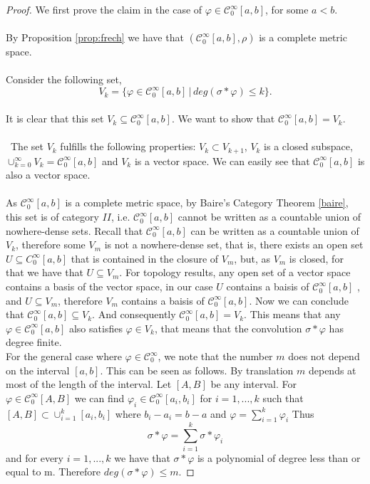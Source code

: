\documentclass[../main.tex]{subfiles}
\begin{document}
	\begin{proof}
		We first prove the claim in the case of $\varphi \in \mathcal{C}^\infty_0[a,b]$, for some $a<b$. \\ \\ By Proposition \ref{prop:frech} we have that $(\mathcal{C}^\infty_0[a,b],\rho)$ is a complete metric space.  \\ \\  Consider the following set, \\ $$V_k= \{\varphi \in \mathcal{C}_0^\infty[a,b] \, | \,  deg(\sigma \ast \varphi ) \leq k\}.$$ \\
		It is clear that this set $V_k\subseteq \mathcal{C}_0^\infty[a,b]. $ 
		We want to show that $\mathcal{C}_0^\infty[a,b] = V_k.$ \\ \\  The set $ V_k$ fulfills the following properties: $V_k \subset V_{k+1}$, $V_k $ is a closed subspace, $\cup_{k=0}^\infty V_k = \mathcal{C}_0^\infty[a,b]$ and $V_k$ is a vector space. We can easily see that $\mathcal{C}_0^\infty[a,b]$ is also a vector space.\\ \\ 
	\noindent As $\mathcal{C}_0^\infty[a,b]$ is a complete metric space, by Baire's Category Theorem \ref{baire}, this set is of category $II$, i.e. $\mathcal{C}_0^\infty[a,b]$  cannot be written as a countable union of nowhere-dense sets. Recall that $\mathcal{C}_0^\infty[a,b]$ can be written as a countable union of $V_k$, therefore some $V_m $ is not a nowhere-dense set, that is, there exists an open set $U\subseteq C_0^\infty[a,b]$ that is contained in the closure of $V_m$, but, as $V_m$ is closed, for that we have that $U\subseteq V_m$. For topology results, any open set of a vector space contains a basis of the vector space, in our case $U$ contains a baisis of $\mathcal{C}_0^\infty[a,b]$ , and $U\subseteq V_m$, therefore $V_m$ contains a baisis of $\mathcal{C}_0^\infty[a,b]$. Now we can conclude that $\mathcal{C}_0^\infty[a,b] \subseteq V_k.$ And consequently $\mathcal{C}_0^\infty[a,b] = V_k.$ This means that any $\varphi \in \mathcal{C}^\infty_0[a,b] $ also satisfies $ \varphi \in V_k$,  that means that the convolution $\sigma \ast \varphi $ has degree finite. \\ 
		
		\noindent For the general case where $\varphi \in \mathcal{C}_0^\infty$, we note that the number $m$ does not depend on the interval $[a,b]$. This can be seen as follows. By translation $m$ depends at most of the length of the interval. Let $[A,B]$ be any interval. For $\varphi \in \mathcal{C}^\infty_0[A,B]$ we can find $\varphi_i \in \mathcal{C}^\infty_0[a_i,b_i]$ for $i=1,...,k$ such that $[A,B] \subset \cup_{i=1}^k[a_i,b_i]$ where $b_i -a_i =b-a$ and $\varphi=\sum_{i=1}^k \varphi_i$ Thus $$\sigma \ast \varphi = \sum_{i=1}^k \sigma \ast \varphi_i$$ and for every $i=1,...,k $ we have that $\sigma \ast \varphi$ is a polynomial of degree less than or equal to m. Therefore $deg(\sigma \ast \varphi) \leq m$.
	\end{proof}
\end{document}
